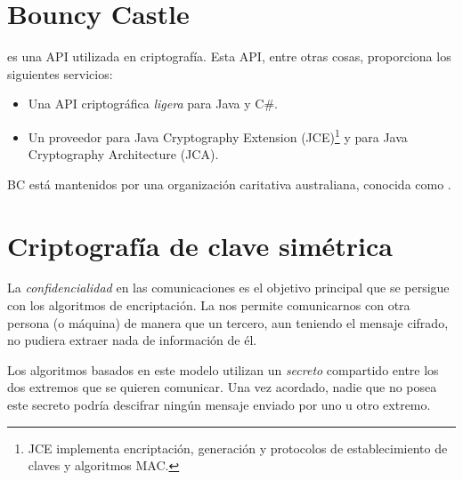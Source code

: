 
 \section{Bouncy Castle}

  es una API utilizada en criptografía.
 Esta API, entre otras cosas, proporciona los siguientes servicios:
 \begin{itemize}
 \item Una API criptográfica \emph{ligera} para Java y C\#.
 \item Un proveedor para Java Cryptography Extension (JCE)\footnote{JCE implementa encriptación, generación y protocolos de establecimiento de claves y algoritmos MAC.} y para Java Cryptography Architecture (JCA).
 \end{itemize}

 BC está mantenidos por una organización caritativa australiana, conocida como . \emph{\parencite{Reference4}}


 \section{Criptografía de clave simétrica}

 La \emph{confidencialidad} en las comunicaciones es el objetivo principal que se persigue con los algoritmos de encriptación.
 La  nos permite comunicarnos con otra persona (o máquina) de manera que un tercero,
 aun teniendo el mensaje cifrado, no pudiera extraer nada de información de él.

 Los algoritmos basados en este modelo utilizan un \emph{secreto} compartido entre los dos extremos que se quieren comunicar.
 Una vez acordado, nadie que no posea este secreto podría descifrar ningún mensaje enviado por uno u otro extremo.

